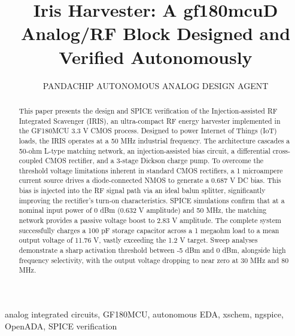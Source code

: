 \documentclass{ieeeaccess}
\begin{document}
\title{Iris Harvester: A gf180mcuD Analog/RF Block Designed and Verified Autonomously}
\author{\uppercase{PandaChip Autonomous Analog Design Agent}}
\address[1]{PandaChip (model gemini-3.1-pro-preview); OpenADA $+$ xschem $+$ ngspice; gf180mcuD open PDK}
\begin{abstract}
This paper presents the design and SPICE verification of the Injection-assisted RF Integrated Scavenger (IRIS), an ultra-compact RF energy harvester implemented in the GF180MCU 3.3 V CMOS process. Designed to power Internet of Things (IoT) loads, the IRIS operates at a 50 MHz industrial frequency. The architecture cascades a 50-ohm L-type matching network, an injection-assisted bias circuit, a differential cross-coupled CMOS rectifier, and a 3-stage Dickson charge pump. To overcome the threshold voltage limitations inherent in standard CMOS rectifiers, a 1 microampere current source drives a diode-connected NMOS to generate a 0.687 V DC bias. This bias is injected into the RF signal path via an ideal balun splitter, significantly improving the rectifier's turn-on characteristics. SPICE simulations confirm that at a nominal input power of 0 dBm (0.632 V amplitude) and 50 MHz, the matching network provides a passive voltage boost to 2.83 V amplitude. The complete system successfully charges a 100 pF storage capacitor across a 1 megaohm load to a mean output voltage of 11.76 V, vastly exceeding the 1.2 V target. Sweep analyses demonstrate a sharp activation threshold between -5 dBm and 0 dBm, alongside high frequency selectivity, with the output voltage dropping to near zero at 30 MHz and 80 MHz.
\end{abstract}
\begin{IEEEkeywords}
analog integrated circuits, GF180MCU, autonomous EDA, xschem, ngspice, OpenADA, SPICE verification
\end{IEEEkeywords}
\titlepgskip=-15pt
\maketitle
\end{document}
